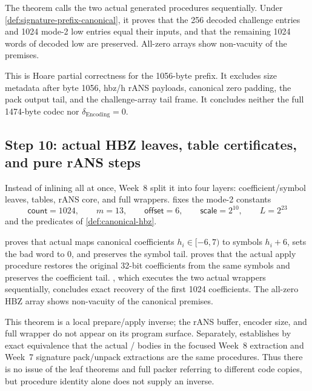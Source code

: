 \begin{verified}
\label{thm:signature-prefix-codec}
The theorem  calls the two
actual generated procedures sequentially. Under
\cref{def:signature-prefix-canonical}, it proves that the 256 decoded challenge
entries and 1024 mode-2 low entries equal their inputs, and that the remaining
1024 words of decoded low are preserved. All-zero arrays show non-vacuity of
the premises.
\end{verified}

This is Hoare partial correctness for the 1056-byte prefix. It excludes size
metadata after byte 1056, hbz/h rANS payloads, canonical zero padding, the pack
output tail, and the challenge-array tail frame. It concludes neither the full
1474-byte codec nor \(\delta_{\mathrm{Encoding}}=0\).

\subsection{Step 10: actual HBZ leaves, table certificates, and pure rANS steps}

Instead of inlining  all at once, Week~8
split it into four layers: coefficient/symbol leaves, tables, rANS core, and
full wrappers.  fixes the mode-2 constants
\[
  \mathsf{count}=1024,\qquad m=13,\qquad \mathsf{offset}=6,\qquad
  \mathsf{scale}=2^{10},\qquad L=2^{23}
\]
and the predicates of \cref{def:canonical-hbz}.

\begin{verified}
\label{thm:hbz-leaf-inverse}
 proves that actual
 maps canonical coefficients
\(h_i\in[-6,7)\) to symbols \(h_i+6\), sets the bad word to 0, and preserves
the symbol tail.  proves that the
actual apply procedure restores the original 32-bit coefficients from the same
symbols and preserves the coefficient tail.
, which executes the two
actual wrappers sequentially, concludes exact recovery of the first 1024
coefficients. The all-zero HBZ array shows non-vacuity of the canonical premises.
\end{verified}

This theorem is a local prepare/apply inverse; the rANS buffer, encoder size,
and full wrapper do not appear on its program surface. Separately,
 establishes by exact equivalence that
the actual /
bodies in the focused Week~8 extraction and Week~7 signature pack/unpack
extractions are the same procedures. Thus there is no issue of the leaf theorems
and full packer referring to different code copies, but procedure identity
alone does not supply an inverse.

